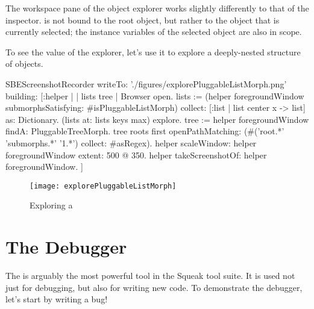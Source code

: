 \documentclass[a4paper,10pt,twoside]{book}
\begin{document}
The workspace pane of the object explorer works slightly differently to that of the inspector.
 is not bound to the root object, but rather to the object that is currently selected; the instance variables of the selected object are also in scope.

To see the value of the explorer, let's use it to explore a deeply-nested structure of objects.


\begin{ExecuteSmalltalkScript}
SBEScreenshotRecorder writeTo: './figures/explorePluggableListMorph.png' building: [:helper |
	| lists tree |	
	Browser open.
	lists := (helper foregroundWindow submorphsSatisfying: #isPluggableListMorph)
		collect: [:list | list center x -> list] as: Dictionary.
	(lists at: lists keys max) explore.
	tree := helper foregroundWindow findA: PluggableTreeMorph.
	tree roots first openPathMatching: (#('root.*' 'submorphs.*' '1.*') collect: #asRegex).
	helper scaleWindow: helper foregroundWindow extent: 500 @ 350.
	helper takeScreenshotOf: helper foregroundWindow.
]
\end{ExecuteSmalltalkScript}
\begin{figure}[tbp]
	\begin{center}
		\texttt{[image: explorePluggableListMorph]}
	\end{center}
	\caption{Exploring a }
	\label{fig:explorePluggableListMorph}
\end{figure}

\section{The Debugger}
\label{sec:debugger} %

The  is arguably the most powerful tool in the Squeak tool suite.  It is used not just for debugging, but also for writing new code.
To demonstrate the debugger, let's start by writing a bug!
\end{document}
